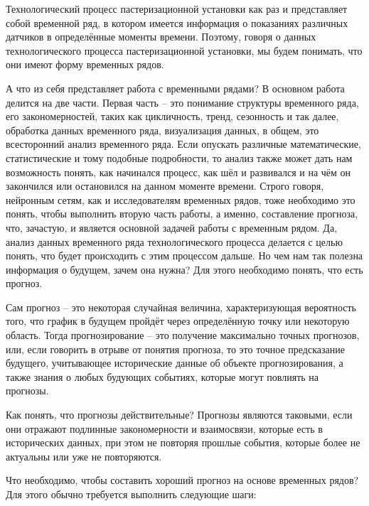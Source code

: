 {  \par \redline Технологический процесс пастеризационной установки как раз и представляет собой временной ряд, в котором имеется информация о показаниях различных датчиков в определённые моменты времени. Поэтому, говоря о данных технологического процесса пастеризационной установки, мы будем понимать, что они имеют форму временных рядов.

  \par \redline А что из себя представляет работа с временными рядами? В основном работа делится на две части. Первая часть {--} это понимание структуры временного ряда, его закономерностей, таких как цикличность, тренд, сезонность и так далее, обработка данных временного ряда, визуализация данных, в общем, это всесторонний анализ временного ряда. Если опускать различные математические, статистические и тому подобные подробности, то анализ также может дать нам возможность понять, как начинался процесс, как шёл и развивался и на чём он закончился или остановился на данном моменте времени.  Строго говоря, нейронным сетям, как и исследователям временных рядов, тоже необходимо это понять, чтобы выполнить вторую часть работы, а именно, составление прогноза, что, зачастую, и является основной задачей работы с временным рядом. Да, анализ данных временного ряда технологического процесса делается с целью понять, что будет происходить с этим процессом дальше. Но чем нам так полезна информация о будущем, зачем она нужна? Для этого необходимо понять, что есть прогноз. 

  \par \redline Сам прогноз {--} это некоторая случайная величина, характеризующая вероятность того, что график в будущем пройдёт через определённую точку или некоторую область. Тогда прогнозирование {--} это получение максимально точных прогнозов, или, если говорить в отрыве от понятия прогноза, то это точное предсказание будущего, учитывающее исторические данные об объекте прогнозирования, а также знания о любых будующих событиях, которые могут повлиять на прогнозы. 

  \par \redline Как понять, что прогнозы действительные? Прогнозы являются таковыми, если они отражают подлинные закономерности и взаимосвязи, которые есть в исторических данных, при этом не повторяя прошлые события, которые более не актуальны или уже не повторяются. 

  \par \redline Что необходимо, чтобы составить хороший прогноз на основе временных рядов? Для этого обычно требуется выполнить следующие шаги:

}

